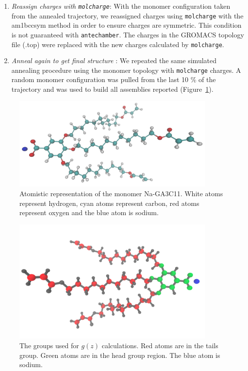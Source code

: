 \documentclass{article}
\begin{document}
\begin{enumerate}
	\item \textit{Reassign charges with \texttt{molcharge}}: With the monomer
	configuration taken from the annealed trajectory, we reassigned charges using
	\texttt{molcharge} with the am1bccsym method in order to ensure charges 
	are symmetric. This condition is not guaranteed with \texttt{antechamber}. 
	The charges in the GROMACS topology file (.top) were replaced with the 
	new charges calculated by \texttt{molcharge}. 
	\item \textit{Anneal again to get final structure} : We repeated the
	same simulated annealing procedure using the monomer topology with
	\texttt{molcharge} charges. A random monomer configuration was pulled from the
	last 10 \% of the trajectory and was used to build all assemblies reported
	(Figure~\ref{fig:monomer}).
  \end{enumerate} 

  \begin{figure}
	\centering
        \includegraphics[width=0.9\textwidth]{monomer.png}
	\caption{Atomistic representation of the monomer Na-GA3C11. White atoms
		represent hydrogen, cyan atoms represent carbon, red atoms represent oxygen and
		the blue atom is sodium.}\label{fig:monomer}
  \end{figure}

  \begin{figure}
	\centering
        \includegraphics[width=0.9\textwidth]{monomer_color_coded.png}
	\caption{The groups used for $g(z)$ calculations. Red atoms are in the
		tails group. Green atoms are in the head group region. The blue atom is sodium. 
		}\label{fig:monomer_color_coded}
  \end{figure}
\end{document}
